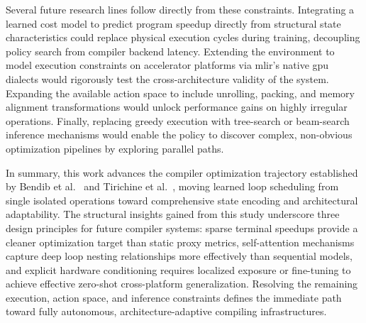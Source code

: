 Several future research lines follow directly from these constraints. Integrating a learned cost model to predict program speedup directly from structural state characteristics could replace physical execution cycles during training, decoupling policy search from compiler backend latency. Extending the environment to model execution constraints on accelerator platforms via \gls{mlir}'s native \gls{gpu} dialects would rigorously test the cross-architecture validity of the system. Expanding the available action space to include unrolling, packing, and memory alignment transformations would unlock performance gains on highly irregular operations. Finally, replacing greedy execution with tree-search or beam-search inference mechanisms would enable the policy to discover complex, non-obvious optimization pipelines by exploring parallel paths.

In summary, this work advances the compiler optimization trajectory established by Bendib et al.~\cite{bendib2024reinforcement} and Tirichine et al.~\cite{tirichine2025reinforcement}, moving learned loop scheduling from single isolated operations toward comprehensive state encoding and architectural adaptability. The structural insights gained from this study underscore three design principles for future compiler systems: sparse terminal speedups provide a cleaner optimization target than static proxy metrics, self-attention mechanisms capture deep loop nesting relationships more effectively than sequential models, and explicit hardware conditioning requires localized exposure or fine-tuning to achieve effective zero-shot cross-platform generalization. Resolving the remaining execution, action space, and inference constraints defines the immediate path toward fully autonomous, architecture-adaptive compiling infrastructures.